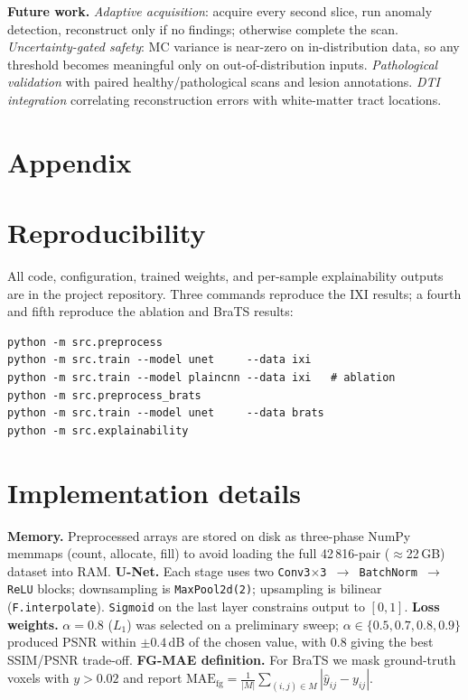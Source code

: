 \documentclass[10pt,a4paper]{article}
\begin{document}
\textbf{Future work.} \emph{Adaptive acquisition}: acquire every second
slice, run anomaly detection, reconstruct only if no findings; otherwise
complete the scan. \emph{Uncertainty-gated safety}: MC variance is
near-zero on in-distribution data, so any threshold becomes meaningful only
on out-of-distribution inputs. \emph{Pathological validation} with paired
healthy/pathological scans and lesion annotations. \emph{DTI integration}
correlating reconstruction errors with white-matter tract locations.

\newpage
\appendix
\section*{\centering Appendix}

\section{Reproducibility}
\label{app:repro}
All code, configuration, trained weights, and per-sample explainability
outputs are in the project repository. Three commands reproduce the IXI
results; a fourth and fifth reproduce the ablation and BraTS results:
\begin{verbatim}
python -m src.preprocess
python -m src.train --model unet     --data ixi
python -m src.train --model plaincnn --data ixi   # ablation
python -m src.preprocess_brats
python -m src.train --model unet     --data brats
python -m src.explainability
\end{verbatim}

\section{Implementation details}
\label{app:impl}
\textbf{Memory.} Preprocessed arrays are stored on disk as three-phase
NumPy memmaps (count, allocate, fill) to avoid loading the full 42\,816-pair
($\approx$22\,GB) dataset into RAM.
\textbf{U-Net.} Each stage uses two
\texttt{Conv3$\times$3 $\to$ BatchNorm $\to$ ReLU} blocks; downsampling is
\texttt{MaxPool2d(2)}; upsampling is bilinear (\texttt{F.interpolate}).
\texttt{Sigmoid} on the last layer constrains output to $[0,1]$.
\textbf{Loss weights.} $\alpha{=}0.8$ ($L_{1}$) was selected on a
preliminary sweep; $\alpha\in\{0.5,0.7,0.8,0.9\}$ produced
PSNR within $\pm0.4$\,dB of the chosen value, with $0.8$ giving the best
SSIM/PSNR trade-off.
\textbf{FG-MAE definition.} For BraTS we mask
ground-truth voxels with $y > 0.02$ and report
$\mathrm{MAE}_{\text{fg}} = \tfrac{1}{|M|}\sum_{(i,j)\in M}|\hat{y}_{ij}-y_{ij}|$.
\end{document}
